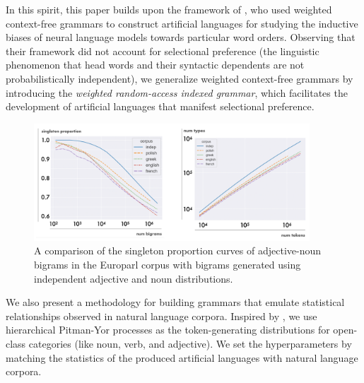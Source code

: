 \documentclass[11pt]{article}
\renewcommand{\bnfpn}[1]{\mathsf{#1}}
\renewcommand{\bnfts}[1]{\mathtt{#1}}
\begin{document}
In this spirit, this paper builds upon the framework of \citet{white-cotterell-2021-examining}, who used weighted context-free grammars to construct artificial languages for studying the inductive biases of neural language models towards particular word orders. Observing that their framework did not account for selectional preference (the linguistic  phenomenon that head words and their syntactic dependents are not probabilistically independent), we generalize weighted context-free grammars by introducing the \emph{weighted random-access indexed grammar}, which facilitates the development of artificial languages that manifest selectional preference.


\begin{figure}[tb]
\centering
\includegraphics[width=0.92\textwidth]{images/demo_plots.png}
\caption{A comparison of the singleton proportion curves of adjective-noun bigrams in the Europarl corpus with bigrams generated using independent adjective and noun distributions.}
\label{fig:motivationcurve}
\end{figure}




We also present a methodology for building grammars that emulate statistical relationships observed in natural language corpora. Inspired by \citet{teh-2006-hierarchical}, we use hierarchical Pitman-Yor processes \cite{pitman1997two} as the token-generating distributions for open-class categories (like noun, verb, and adjective). We set the hyperparameters by matching the statistics of the produced artificial languages with natural language corpora.
\end{document}
